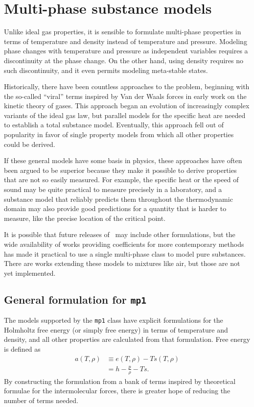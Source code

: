\chapter{Multi-phase substance models}\label{ch:mp}

Unlike ideal gas properties, it is sensible to formulate multi-phase properties in terms of temperature and density instead of temperature and pressure.  Modeling phase changes with temperature and pressure as independent variables requires a discontinuity at the phase change.  On the other hand, using density requires no such discontinuity, and it even permits modeling meta-stable states.

Historically, there have been countless approaches to the problem, beginning with the so-called ``viral'' terms inspired by Van der Waals forces in early work on the kinetic theory of gases.  This approach began an evolution of increasingly complex variants of the ideal gas law, but parallel models for the specific heat are needed to establish a total substance model.  Eventually, this approach fell out of popularity in favor of single property models from which all other properties could be derived.  

If these general models have some basis in physics, these approaches have often been argued to be superior because they make it possible to derive properties that are not so easily measured.  For example, the specific heat or the speed of sound may be quite practical to measure precisely in a laboratory, and a substance model that reliably predicts them throughout the thermodynamic domain may also provide good predictions for a quantity that is harder to measure, like the precise location of the critical point.

It is possible that future releases of \PM\ may include other formulations, but the wide availability of works providing coefficients for more contemporary methods has made it practical to use a single multi-phase class to model pure substances.  There are works extending these models to mixtures like air, but those are not yet implemented.

\section{General formulation for \texttt{mp1}}\label{sec:mp:mp1}

The models supported by the \texttt{mp1} class have explicit formulations for the Holmholtz free energy (or simply free energy) in terms of temperature and density, and all other properties are calculated from that formulation.  Free energy is defined as
\begin{align}
a(T,\rho) &\equiv e(T,\rho) - T s(T,\rho)\\
 &= h - \frac{p}{\rho} - T s.
\end{align}
By constructing the formulation from a bank of terms inspired by theoretical formulae for the intermolecular forces, there is greater hope of reducing the number of terms needed. 

